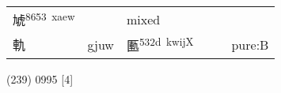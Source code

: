 \documentclass[14pt,a4paper]{scrartcl}
\begin{document}
\begin{longtable}[c]{@{}llllll@{}}
\begin{minipage}[t]{0.14\columnwidth}
虓\textsuperscript{8653~xaew}
\strut\end{minipage} &
\begin{minipage}[t]{0.14\columnwidth}\raggedright\strut
\strut\end{minipage} &
\begin{minipage}[t]{0.14\columnwidth}\raggedright\strut
mixed
\strut\end{minipage}\tabularnewline
\begin{minipage}[t]{0.14\columnwidth}\raggedright\strut
軌
\strut\end{minipage} &
\begin{minipage}[t]{0.14\columnwidth}\raggedright\strut
gjuw
\strut\end{minipage} &
\begin{minipage}[t]{0.14\columnwidth}\raggedright\strut
匭\textsuperscript{532d~kwijX}
\strut\end{minipage} &
\begin{minipage}[t]{0.14\columnwidth}\raggedright\strut
\strut\end{minipage} &
\begin{minipage}[t]{0.14\columnwidth}\raggedright\strut
\strut\end{minipage} &
\begin{minipage}[t]{0.14\columnwidth}\raggedright\strut
pure:B
\strut\end{minipage}\tabularnewline
\bottomrule
\end{longtable}

(239) 0995 {[}4{]}
\end{document}
